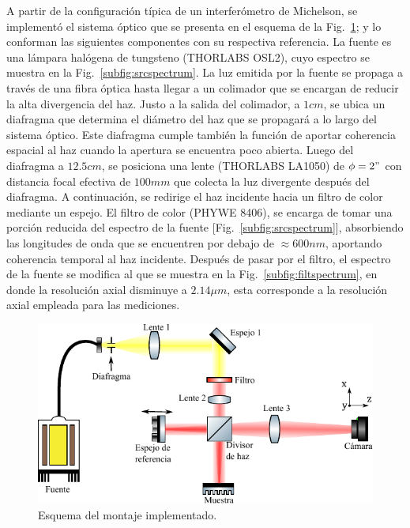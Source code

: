 A partir de la configuración típica de un interferómetro de Michelson, se implementó el sistema óptico que se presenta en el esquema de la Fig.~\ref{fig:montajescheme}; y lo conforman las siguientes componentes con su respectiva referencia. La fuente es una lámpara halógena de tungsteno (THORLABS OSL2), cuyo espectro se muestra en la Fig.~\ref{subfig:srcspectrum}. La luz emitida por la fuente se propaga a través de una fibra óptica hasta llegar a un colimador que se encargan de reducir la alta divergencia del haz. Justo a la salida del colimador, a $1cm$, se ubica un diafragma que determina el diámetro del haz que se propagará a lo largo del sistema óptico. Este diafragma cumple también la función de aportar coherencia espacial al haz cuando la apertura se encuentra poco abierta. Luego del diafragma a $12.5cm$, se posiciona una lente (THORLABS LA1050) de $\phi=2"$ con distancia focal efectiva de $100mm$ que colecta la luz divergente después del diafragma. A continuación, se redirige el haz incidente hacia un filtro de color mediante un espejo. El filtro de color (PHYWE 8406), se encarga de tomar una porción reducida del espectro de la fuente [Fig.~\ref{subfig:srcspectrum}], absorbiendo las longitudes de onda que se encuentren por debajo de $\approx600nm$, aportando coherencia temporal al haz incidente. Después de pasar por el filtro, el espectro de la fuente se modifica al que se muestra en la Fig.~\ref{subfig:filtspectrum}, en donde la resolución axial disminuye a $2.14 \mu m$, esta corresponde a la resolución axial empleada para las mediciones. 
\begin{figure}[ht!]
	\centering
	\includegraphics[width=0.8\linewidth]{img/chap2/Montaje_scheme}
	\caption[Esquema del montaje.]{Esquema del montaje implementado.}
	\label{fig:montajescheme}
\end{figure}

